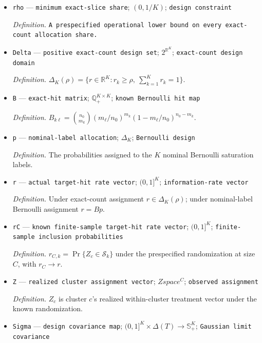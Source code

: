 \documentclass{article}
\begin{document}
\begin{itemize}
  \item \texttt{rho} --- \texttt{minimum exact-\allowbreak{}slice share}; \((0,1/K)\); \texttt{design constraint}
  \par\smallskip\noindent\emph{Definition.} \texttt{A prespecified operational lower bound on every exact-\allowbreak{}count allocation share.}
  \item \texttt{Delta} --- \texttt{positive exact-\allowbreak{}count design set}; \(2^{\mathbb R^K}\); \texttt{exact-\allowbreak{}count design domain}
  \par\smallskip\noindent\emph{Definition.} \(\Delta_K(\rho)=\{r\in\mathbb R^K:r_k\ge\rho,\ \sum_{k=1}^{K}r_k=1\}\).
  \item \texttt{B} --- \texttt{exact-\allowbreak{}hit matrix}; \(\mathbb Q_+^{K\times K}\); \texttt{known Bernoulli hit map}
  \par\smallskip\noindent\emph{Definition.} \(B_{k\ell}={n_0\choose m_k}(m_\ell/n_0)^{m_k}(1-m_\ell/n_0)^{n_0-m_k}\).
  \item \texttt{p} --- \texttt{nominal-\allowbreak{}label allocation}; \(\Delta_K\); \texttt{Bernoulli design}
  \par\smallskip\noindent\emph{Definition.} The probabilities assigned to the \(K\) nominal Bernoulli saturation labels.
  \item \texttt{r} --- \texttt{actual target-\allowbreak{}hit rate vector}; \((0,1]^K\); \texttt{information-\allowbreak{}rate vector}
  \par\smallskip\noindent\emph{Definition.} Under exact-count assignment \(r\in\Delta_K(\rho)\); under nominal-label Bernoulli assignment \(r=Bp\).
  \item \texttt{rC} --- \texttt{known finite-\allowbreak{}sample target-\allowbreak{}hit rate vector}; \((0,1]^K\); \texttt{finite-\allowbreak{}sample inclusion probabilities}
  \par\smallskip\noindent\emph{Definition.} \(r_{C,k}=\Pr\{Z_c\in\mathcal S_k\}\) under the prespecified randomization at size \(C\), with \(r_C\to r\).
  \item \texttt{Z} --- \texttt{realized cluster assignment vector}; \(Zspace^C\); \texttt{observed assignment}
  \par\smallskip\noindent\emph{Definition.} \(Z_c\) is cluster \(c\)'s realized within-cluster treatment vector under the known randomization.
  \item \texttt{Sigma} --- \texttt{design covariance map}; \((0,1]^K\times\Delta(T)\to\mathbb S_+^K\); \texttt{Gaussian limit covariance}

\end{itemize}
\end{document}
